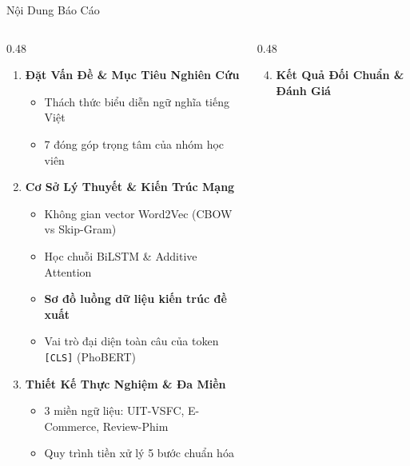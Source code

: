 \documentclass[aspectratio=169, 10pt]{beamer}
\begin{document}
\begin{frame}{Nội Dung Báo Cáo}
  \begin{columns}[T, onlytextwidth]
    \begin{column}{0.48\textwidth}
      \begin{enumerate}
        \setlength{\itemsep}{0.6em}
        \item \textbf{\color{HCMUEDarkBlue}Đặt Vấn Đề \& Mục Tiêu Nghiên Cứu}
        \begin{itemize}\fontsize{8}{10}\selectfont\setlength{\itemsep}{0.15em}
          \item Thách thức biểu diễn ngữ nghĩa tiếng Việt
          \item 7 đóng góp trọng tâm của nhóm học viên
        \end{itemize}
        \item \textbf{\color{HCMUEDarkBlue}Cơ Sở Lý Thuyết \& Kiến Trúc Mạng}
        \begin{itemize}\fontsize{8}{10}\selectfont\setlength{\itemsep}{0.15em}
          \item Không gian vector Word2Vec (CBOW vs Skip-Gram)
          \item Học chuỗi BiLSTM \& Additive Attention
          \item \textbf{Sơ đồ luồng dữ liệu kiến trúc đề xuất}
          \item Vai trò đại diện toàn câu của token \texttt{[CLS]} (PhoBERT)
        \end{itemize}
        \item \textbf{\color{HCMUEDarkBlue}Thiết Kế Thực Nghiệm \& Đa Miền}
        \begin{itemize}\fontsize{8}{10}\selectfont\setlength{\itemsep}{0.15em}
          \item 3 miền ngữ liệu: UIT-VSFC, E-Commerce, Review-Phim
          \item Quy trình tiền xử lý 5 bước chuẩn hóa
        \end{itemize}
      \end{enumerate}
    \end{column}
    \hfill
    \begin{column}{0.48\textwidth}
      \begin{enumerate}
        \setcounter{enumi}{3}
        \setlength{\itemsep}{0.6em}
        \item \textbf{\color{HCMUEDarkBlue}Kết Quả Đối Chuẩn \& Đánh Giá}
        \begin{itemize}\fontsize{8}{10}\selectfont\setlength{\itemsep}{0.15em}

\end{itemize}
\end{enumerate}
\end{column}
\end{columns}
\end{frame}
\end{document}
